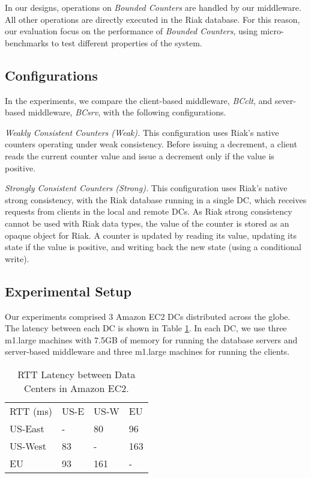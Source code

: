 \documentclass[conference]{IEEEtran}
\newcommand{\InvCounters}{\emph{Bounded Counters}}
\begin{document}
In our designs, operations on \InvCounters{} are handled by our middleware. All other operations
are directly executed in the Riak database.
For this reason, our evaluation focus on the performance of \InvCounters{}, using micro-benchmarks 
to test different properties of the system.

\subsection{Configurations}

In the experiments, we compare the client-based middleware, \emph{BCclt}, and
sever-based middleware, \emph{BCsrv}, with the following 
configurations.

\emph{Weakly Consistent Counters (Weak).} 
This configuration uses Riak's native counters operating under weak consistency. 
Before issuing a decrement, a client reads the current counter value and issue 
a decrement only if the value is positive.



\emph{Strongly Consistent Counters (Strong).} 
This configuration uses Riak's native strong consistency, with
the Riak database running in a single DC, which 
receives requests from clients in the local and remote DCs.
As Riak strong consistency cannot be used with Riak data types, the
value of the counter is stored as an opaque object for Riak.
A counter is updated by reading its value, updating its state if the value is
positive, and writing back the new state (using a conditional write).




\subsection{Experimental Setup}

Our experiments comprised 3 Amazon EC2 DCs distributed across the globe.
The latency between each DC is shown in Table \ref{table:latency_table}.
In each DC, we use three m1.large machines with 7.5GB of memory for running 
the database servers and server-based middleware and three m1.large machines
for running the clients.

\begin{table}[h]
\center
\begin{tabular}{llll}
RTT (ms) & US-E & US-W & EU \\
US-East    & -        & 80   & 96        \\
US-West      & 83       & -      & 163     \\
EU      & 93     & 161    & -        
\end{tabular}
\caption{RTT Latency between Data Centers in Amazon EC2.}
\label{table:latency_table}
\end{table}
\end{document}
